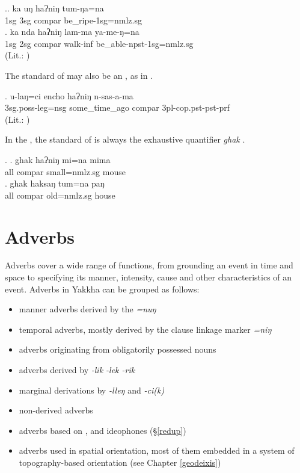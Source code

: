 \ex.\ag. ka uŋ haʔniŋ  tum-ŋa=na\\
			{\sc 1sg} {\sc 3sg}  {\sc compar} be\_ripe-{\sc 1sg=nmlz.sg}	\\
	 \bg.  ka nda haʔniŋ lam-ma ya-me-ŋ=na\\
			{\sc 1sg} {\sc 2sg}  {\sc compar}  walk{\sc -inf} be\_able{\sc -npst-1sg=nmlz.sg}\\
	 (Lit.: )
	
The standard of  may also be an , as in \Next. 

\exg. u-laŋ=ci encho haʔniŋ n-sas-a-ma\\
		{\sc 3sg.poss}-leg{\sc =nsg} some\_time\_ago {\sc compar} {\sc 3pl-cop.pst-pst-prf}\\
	 (Lit.: )

In the , the standard of  is always the exhaustive quantifier \emph{ghak}  \Next. 

\ex. \ag. ghak haʔniŋ mi=na  mima\\
	all {\sc compar} small{\sc =nmlz.sg} mouse\\
 
\bg. ghak haksaŋ tum=na  paŋ\\
all  {\sc compar} old{\sc =nmlz.sg} house\\
 


\section{Adverbs}\label{adv}

Adverbs cover a wide range of functions, from grounding an event in time and space to specifying its manner, intensity, cause and other characteristics of an event. Adverbs in Yakkha can be grouped as follows:

\begin{itemize}
\item manner adverbs derived by the  \emph{=nuŋ}
\item temporal adverbs, mostly derived by the clause linkage marker  \emph{=niŋ} 
\item adverbs originating from obligatorily possessed nouns
\item adverbs derived by \emph{-lik \ti -lek \ti -rik}
\item marginal derivations by \emph{-lleŋ} and \emph{-ci(k)}
\item non-derived adverbs
\item adverbs based on ,  and ideophones (§\ref{redup})
\item adverbs used in spatial orientation, most of them embedded in a system of topography-based orientation (see Chapter \ref{geodeixis})
\end{itemize}

